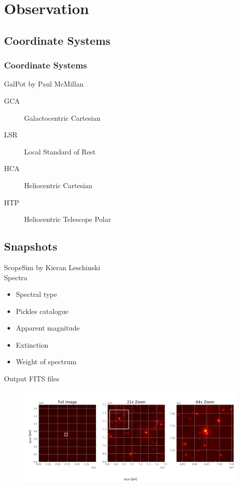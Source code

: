 \documentclass{beamer}
\begin{document}
\section{Observation}

\subsection{Coordinate Systems}

\begin{frame}
\frametitle{Coordinate Systems}

GalPot by Paul McMillan
\\[2ex]
\begin{description}
\item[GCA] Galactocentric Cartesian
\item[LSR] Local Standard of Rest
\item[HCA] Heliocentric Cartesian
\item[HTP] Heliocentric Telescope Polar
\end{description}

\end{frame}

\subsection{Snapshots}

\begin{frame}

ScopeSim by Kieran Leschinski
\\[2ex]
Spectra
\begin{itemize}
\item Spectral type
\item Pickles catalogue
\item Apparent magnitude
\item Extinction
\item Weight of spectrum
\end{itemize}
\vspace{\baselineskip}
Output FITS files
\end{frame}

\begin{frame}
\begin{figure}
\centering
\includegraphics[width=\textwidth]{Images/fits_snapshot.png}
\end{figure}
\end{frame}
\end{document}
